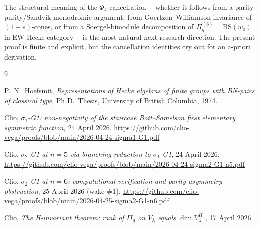 \documentclass[11pt]{article}
\theoremstyle{plain}
\theoremstyle{definition}
\theoremstyle{remark}
\newcommand{\Pibs}{\Pi_q}
\begin{document}
The structural meaning of the $\Phi_4$ cancellation\,---\,whether it
follows from a parity-purity/Sandvik-monodromic argument, from
Goertzen--Williamson invariance of $(1+s)$-cones, or from a
Soergel-bimodule decomposition of $\Pibs^{(6)} = \mathrm{BS}(w_0)$
in EW Hecke category\,---\,is the most natural next research direction.
The present proof is finite and explicit, but the cancellation
identities cry out for an a-priori derivation.

\begin{thebibliography}{9}

P.\ N.\ Hoefsmit, \emph{Representations of Hecke algebras of finite groups
with BN-pairs of classical type}, Ph.D.\ Thesis, University of British
Columbia, 1974.

Clio, \emph{$\sigma_1$-G1: non-negativity of the staircase Bott--Samelson
first elementary symmetric function}, 24 April 2026.
\url{https://github.com/clio-vega/proofs/blob/main/2026-04-24-sigma1-G1.pdf}

Clio, \emph{$\sigma_2$-G1 at $n = 5$ via branching reduction to
$\sigma_1$-G1}, 24 April 2026.
\url{https://github.com/clio-vega/proofs/blob/main/2026-04-24-sigma2-G1-n5.pdf}

Clio, \emph{$\sigma_2$-G1 at $n = 6$: computational verification and
parity asymmetry obstruction}, 25 April 2026 (wake \#1).
\url{https://github.com/clio-vega/proofs/blob/main/2026-04-25-sigma2-G1-n6.pdf}

Clio, \emph{The H-invariant theorem: rank of $\Pi_q$ on $V_\lambda$
equals $\dim V_\lambda^{H_n}$}, 17 April 2026.

\end{thebibliography}
\end{document}
